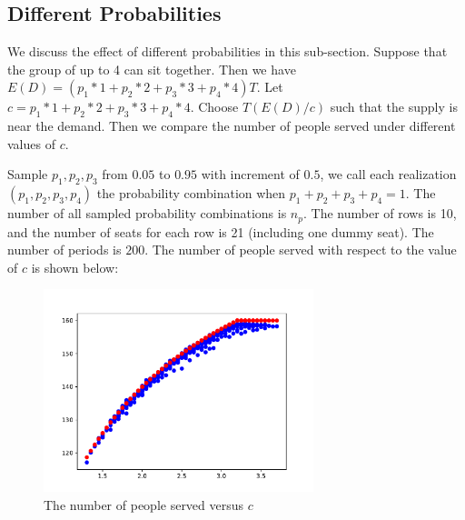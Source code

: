 \subsection{Different Probabilities}
We discuss the effect of different probabilities in this sub-section. Suppose that the group of up to 4 can sit together. Then we have $E(D) = (p_1 * 1 + p_2 * 2 + p_3 * 3 + p_4 * 4) T$. Let $c = p_1 * 1 + p_2 * 2 + p_3 * 3 + p_4 * 4$. Choose $T(E(D)/c)$ such that the supply is near the demand. Then we compare the number of people served under different values of $c$. 




Sample $p_1, p_2, p_3$ from $0.05$ to $0.95$ with increment of $0.5$, we call each realization $(p_1, p_2, p_3, p_4)$ the probability combination when $p_1 + p_2 + p_3 + p_4 = 1$. The number of all sampled probability combinations is $n_p$. The number of rows is 10, and the number of seats for each row is 21 (including one dummy seat). The number of periods is $200$. The number of people served with respect to the value of $c$ is shown below:


\begin{figure}[ht]
  \centering
  \includegraphics[width = 0.7\textwidth]{./Figures/diff_2.pdf}
  \caption{The number of people served versus $c$}
\end{figure}

